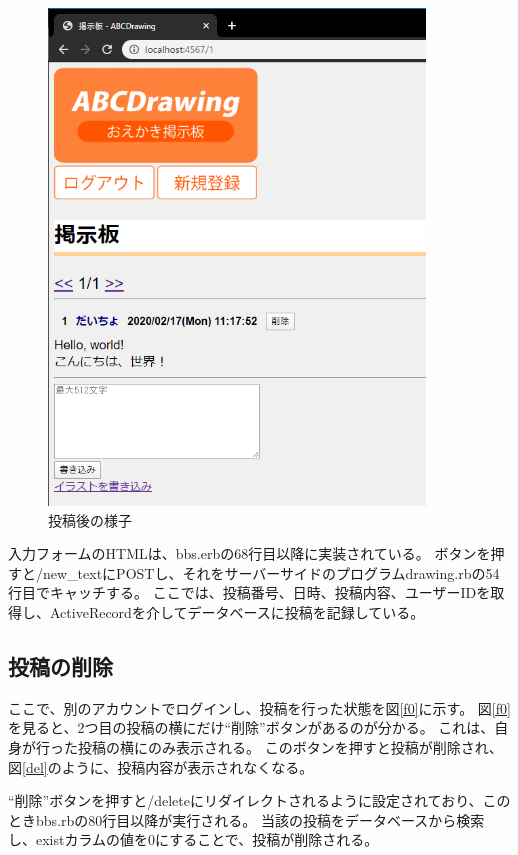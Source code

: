 \documentclass[a4j,titlepage]{jsarticle}
\begin{document}
\begin{figure}[H]
  \centering
  \includegraphics[width=10cm]{bbs03.png}
  \caption{投稿後の様子}
  \label{f2}
\end{figure}

入力フォームのHTMLは、bbs.erbの68行目以降に実装されている。
ボタンを押すと/new\_textにPOSTし、それをサーバーサイドのプログラムdrawing.rbの54行目でキャッチする。
ここでは、投稿番号、日時、投稿内容、ユーザーIDを取得し、ActiveRecordを介してデータベースに投稿を記録している。

\subsection{投稿の削除}
ここで、別のアカウントでログインし、投稿を行った状態を図\ref{f0}に示す。
図\ref{f0}を見ると、2つ目の投稿の横にだけ``削除''ボタンがあるのが分かる。
これは、自身が行った投稿の横にのみ表示される。
このボタンを押すと投稿が削除され、図\ref{del}のように、投稿内容が表示されなくなる。

``削除''ボタンを押すと/deleteにリダイレクトされるように設定されており、このときbbs.rbの80行目以降が実行される。
当該の投稿をデータベースから検索し、existカラムの値を0にすることで、投稿が削除される。
\end{document}
